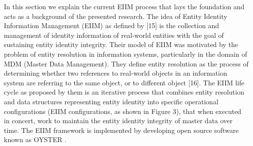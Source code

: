 In this section we explain the current EIIM process that lays the foundation and acts as a background of the presented research.
The idea of Entity Identity Information Management (EIIM) as defined by [15] is the collection and management of identity information of real-world entities with the goal of sustaining entity identity integrity. Their model of EIIM was motivated by the problem of entity resolution in information systems, particularly in the domain of MDM (Master Data Management). They define entity resolution as the process of determining whether two references to real-world objects in an information system are referring to the same object, or to different object [16]. The EIIM life cycle as proposed by them is an iterative process that combines entity resolution and data structures representing entity identity into specific operational configurations (EIIM configurations, as shown in Figure 3), that when executed in concert, work to maintain the entity identity integrity of master data over time. The EIIM framework is implemented by developing open source software known as OYSTER .

